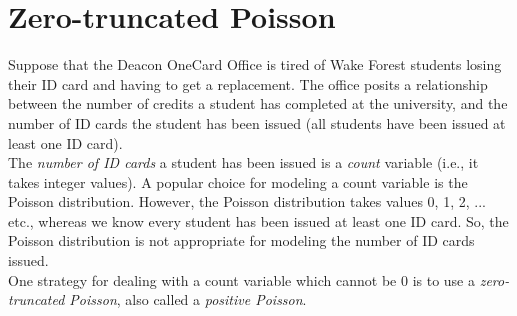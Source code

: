 \documentclass[11pt]{article}
\begin{document}
\newpage

\section*{Zero-truncated Poisson}

Suppose that the Deacon OneCard Office is tired of Wake Forest students losing their ID card and having to get a replacement. The office posits a relationship between the number of credits a student has completed at the university, and the number of ID cards the student has been issued (all students have been issued at least one ID card).\\

\noindent The \textit{number of ID cards} a student has been issued is a \textit{count} variable (i.e., it takes integer values). A popular choice for modeling a count variable is the Poisson distribution. However, the Poisson distribution takes values 0, 1, 2, ... etc., whereas we know every student has been issued at least one ID card. So, the Poisson distribution is not appropriate for modeling the number of ID cards issued.\\

\noindent One strategy for dealing with a count variable which cannot be 0 is to use a \textit{zero-truncated Poisson}, also called a \textit{positive Poisson}.
\end{document}
